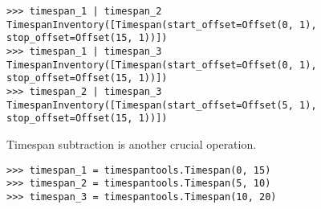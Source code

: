 \begin{comment}
<abjad>
timespan_1 | timespan_2
timespan_1 | timespan_3
timespan_2 | timespan_3
</abjad>
\end{comment}

\begin{singlespacing}
\begin{lstlisting}
>>> timespan_1 | timespan_2
TimespanInventory([Timespan(start_offset=Offset(0, 1), stop_offset=Offset(15, 1))])
>>> timespan_1 | timespan_3
TimespanInventory([Timespan(start_offset=Offset(0, 1), stop_offset=Offset(15, 1))])
>>> timespan_2 | timespan_3
TimespanInventory([Timespan(start_offset=Offset(5, 1), stop_offset=Offset(15, 1))])
\end{lstlisting}
\end{singlespacing}

Timespan subtraction is another crucial operation.

\begin{comment}
<abjad>
timespan_1 = timespantools.Timespan(0, 15)
timespan_2 = timespantools.Timespan(5, 10)
timespan_3 = timespantools.Timespan(10, 20)
</abjad>
\end{comment}

\begin{singlespacing}
\begin{lstlisting}
>>> timespan_1 = timespantools.Timespan(0, 15)
>>> timespan_2 = timespantools.Timespan(5, 10)
>>> timespan_3 = timespantools.Timespan(10, 20)
\end{lstlisting}
\end{singlespacing}

\begin{comment}
<abjad>
print(format(timespan_1 - timespan_1))
print(format(timespan_1 - timespan_2))
print(format(timespan_1 - timespan_3))
print(format(timespan_2 - timespan_1))
print(format(timespan_2 - timespan_2))
print(format(timespan_2 - timespan_3))
print(format(timespan_3 - timespan_1))
print(format(timespan_3 - timespan_2))
print(format(timespan_3 - timespan_3))
</abjad>
\end{comment}

